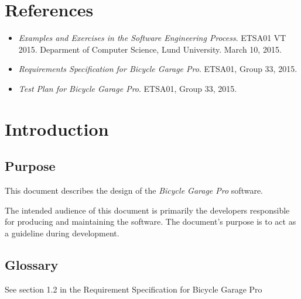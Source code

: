 \documentclass[12pt,titlepage]{article}
\begin{document}


\maketitle
\newpage
\tableofcontents
\thispagestyle{empty}
\setcounter{page}{0}
\newpage


\section{References}
\label{sec:references}

\begin{itemize}
	\item \textit{Examples and Exercises in the Software
		Engineering Process}. ETSA01 VT 2015. Deparment of Computer
		Science, Lund University. March 10, 2015.
	\item \textit{Requirements Specification for Bicycle Garage Pro}. ETSA01, Group 33, 2015.
	\item \textit{Test Plan for Bicycle Garage Pro}. ETSA01, Group 33, 2015.
\end{itemize}


\section{Introduction}
\label{sec:introduction}

\subsection{Purpose}
\label{subsec:introduction-purpose}

This document describes the design of the \textit{Bicycle Garage Pro} software.

The intended audience of this document is primarily the developers responsible
for producing and maintaining the software. The document's purpose is to act as
a guideline during development.

\subsection{Glossary}
\label{subsec:introduction-glossary}
See section 1.2 in the Requirement Specification for Bicycle Garage Pro
\end{document}

